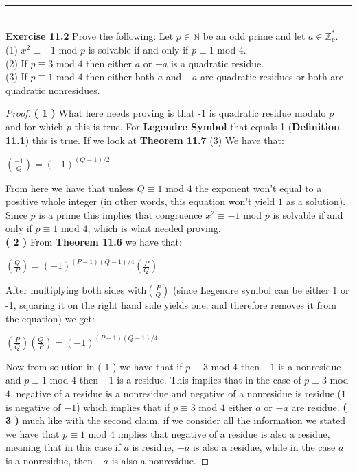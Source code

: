 \documentclass[a4paper]{article}
\begin{document}
\noindent\rule{12cm}{0.4pt}\\
\noindent \textbf{Exercise 11.2} Prove the following: Let $p \in \mathbb{N}$ be an odd prime and let $a \in \mathbb{Z}^{*}_{p}$.\\
(1) $ x^{2} \equiv -1$ mod $p$ is solvable if and only if $p \equiv 1$ mod 4.\\
(2) If $p \equiv 3$ mod $4$ then either $a$ or $-a$ is a quadratic residue.\\
(3) If $p \equiv 1$ mod $4$ then either both $a$ and $-a$ are quadratic residues or both are quadratic nonresidues.
\begin{proof}
\textbf{( 1 )} What here needs proving is that -1 is quadratic residue modulo $p$ and for which $p$ this is true. For \textbf{Legendre Symbol} that equals 1 (\textbf{Definition 11.1}) this is true. If we look at \textbf{Theorem 11.7} (3) We have that:
\begin{center}
$\left(\frac{-1}{Q}\right) = (-1)^{(Q-1)/2}$
\end{center}
From here we have that unless $Q \equiv 1$ mod $4$ the exponent won't equal to a positive whole integer (in other words, this equation won't yield $1$ as a solution). Since $p$ is a prime this implies that congruence $x^{2} \equiv -1$ mod $p$ is solvable if and only if $p \equiv 1$ mod $4$, which is what needed proving. \\
\textbf{( 2 )} From \textbf{Theorem 11.6} we have that:
\begin{center}
$\left(\frac{Q}{P}\right) = (-1)^{(P-1)(Q-1)/4}\left(\frac{P}{Q}\right)$
\end{center}
After multiplying both sides with$\left(\frac{P}{Q}\right)$ (since Legendre symbol can be either 1 or -1, squaring it on the right hand side yields one, and therefore removes it from the equation) we get:
\begin{center}
$\left(\frac{P}{Q}\right)\left(\frac{Q}{P}\right) = (-1)^{(P-1)(Q-1)/4}$
\end{center}
Now from solution in ( 1 ) we have that if $p \equiv 3$ mod $4$ then $-1$ is a nonresidue and $p \equiv 1$ mod $4$ then $-1$ is a residue. This implies that in the case of $p \equiv 3$ mod $4$, negative of a residue is a nonresidue and negative of a nonresidue is residue ($1$ is negative of $-1$) which implies that if $p \equiv 3$ mod $4$ either $a$ or $-a$ are residue.
\textbf{( 3 )} much like with the second claim, if we consider all the information we stated we have that $p \equiv 1$ mod $4$ implies that negative of a residue is also a residue, meaning that in this case if $a$ is residue, $-a$ is also a residue, while in the case $a$ is a nonresidue, then $-a$ is also a nonresidue.
\end{proof}
\end{document}
